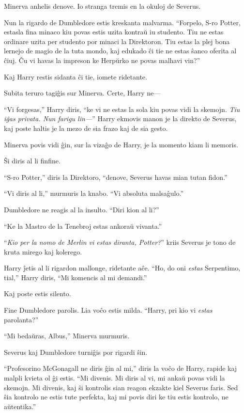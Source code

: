 Minerva anhelis denove. Io stranga tremis en la okuloj de Severus.

Nun la rigardo de Dumbledore estis kreskanta malvarma. ``Forpelo, S-ro
Potter, estasla fina minaco kiu povas estis uzita kontraŭ iu
studento. Tiu ne estas ordinare uzita per studento por minaci la
Direktoron.  Tiu estas la plej bona lernejo de magio de la tuta mondo,
kaj edukado ĉi tie ne estas ŝanco oferita al ĉiuj. Ĉu vi havas la
impreson ke Herpŭrko ne povas malhavi vin?''

Kaj Harry restis sidanta ĉi tie, iomete ridetante.

Subita teruro tagiĝis sur Minerva. Certe, Harry ne—

``Vi forgesas,'' Harry diris, ``ke vi ne estas la sola kiu povas vidi
la skemojn. \emph{Tiu iĝas privata. Nun farigu lin—}'' Harry ekmovis
manon je la direkto de Severus, kaj poste haltis je la mezo de sia
frazo kaj de sia gesto.

Minerva povis vidi ĝin, sur la vizaĝo de Harry, je la momento kiam li memoris.

Ŝi diris al li finfine.

``S-ro Potter,'' diris la Direktoro, ``denove, Severus havas mian tutan fidon.''

``Vi diris al li,'' murmuris la knabo. ``Vi absoluta malsaĝulo.''

Dumbledore ne reagis al la insulto. ``Diri kion al li?''

``Ke la Mastro de la Tenebroj estas ankoraŭ vivanta.''

``\emph{Kio per la nomo de Merlin vi estas diranta, Potter?}'' kriis
Severus je tono de kruta mirego kaj kolerego.

Harry ĵetis al li rigardon mallonge, ridetante aĉe. ``Ho, do oni
\emph{estas} Serpentimo, tial,'' Harry diris, ``Mi komencis al mi
demandi.''

Kaj poste estis silento.

Fine Dumbledore parolis. Lia voĉo estis milda. ``Harry, pri kio vi
\emph{estas} parolanta?''

``Mi bedaŭras, Albus,'' Minerva murmuris.

Severus kaj Dumbledore turniĝis por rigardi ŝin.

``Profesorino McGonagall ne diris ĝin al mi,'' diris la voĉo de Harry,
rapide kaj malpli kvieta ol ĝi estis. ``Mi divenis. Mi diris al vi, mi
ankaŭ povas vidi la skemojn. Mi divenis, kaj ŝi kontrolis sian reagon
ekzakte kiel Severus faris. Sed ŝia kontrolo ne estis tute perfekta,
kaj mi povis diri ke tiu estis kontrolo, ne aŭtentika.''

